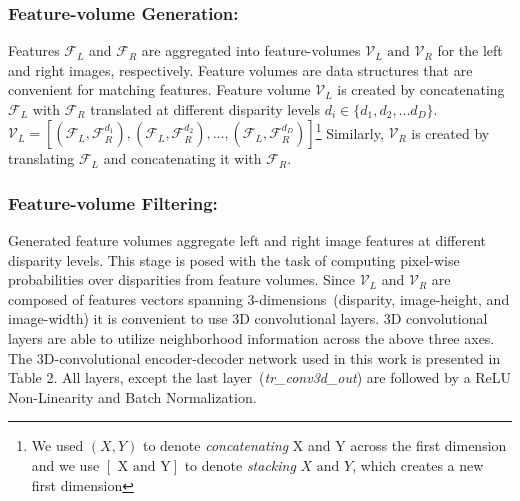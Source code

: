 \documentclass[runningheads]{llncs}
\begin{document}
\subsubsection*{Feature-volume Generation:} \sloppy Features ${\mathcal{F}_{L}}$ and ${\mathcal{F}_{R}}$ are aggregated into feature-volumes $\mathcal{V}_{L} \text{ and } \mathcal{V}_{R}$ for the left and right images, respectively. Feature volumes are data structures that are convenient for matching features. Feature volume $\mathcal{V}_{L}$ is created by concatenating $\mathcal{F}_{L}$ with $\mathcal{F}_{R}$ translated at different disparity levels $d_{i} \in \{d_{1}, d_{2}, \dots d_{D}\}$. $\mathcal{V}_{L} = [( \mathcal{F}_{L}, \mathcal{F}^{d_{1}}_{R}), (\mathcal{F}_{L}, \mathcal{F}^{d_{2}}_{R}), \dots, (\mathcal{F}_{L}, \mathcal{F}^{d_{D}}_{R})]$\footnote{We used $(X, Y)$ to denote \textit{concatenating} X and Y across the first dimension and we use $[\text{ X and Y}]$ to denote \textit{stacking} $X \text{ and } Y$, which creates a new first dimension} Similarly, $\mathcal{V}_{R}$ is created by translating $\mathcal{F}_{L}$ and concatenating it with $\mathcal{F}_{R}$. %

\subsubsection*{Feature-volume Filtering:} \sloppy Generated feature volumes aggregate left and right image features at different disparity levels. This stage is posed with the task of computing pixel-wise probabilities over disparities from feature volumes. Since $\mathcal{V}_{L}$ and $\mathcal{V}_{R}$ are composed of features vectors spanning 3-dimensions~(disparity, image-height, and image-width) it is convenient to use 3D convolutional layers. 3D convolutional layers are able to utilize neighborhood information across the above three axes. 
The 3D-convolutional encoder-decoder network used in this work is presented in Table 2. All layers, except the last layer~(\textit{tr\_conv3d\_out}) are followed by a ReLU Non-Linearity and Batch Normalization. 
\end{document}
